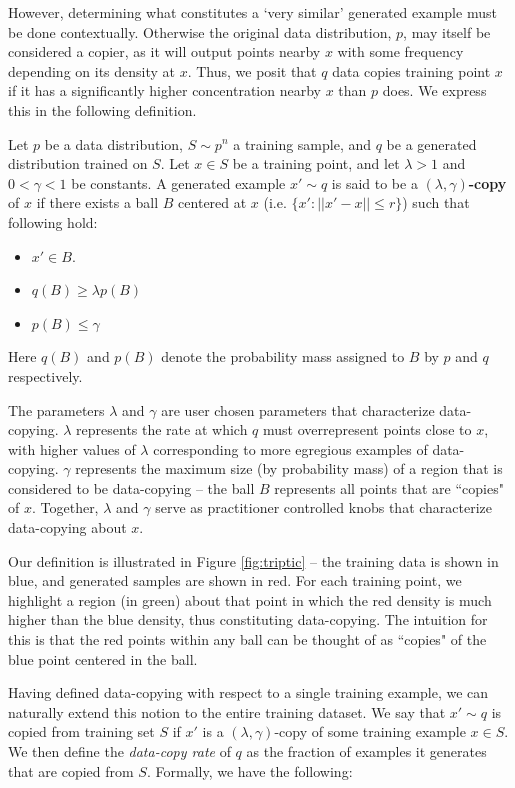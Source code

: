 However, determining what constitutes a `very similar'  generated example must be done contextually. Otherwise the original data distribution, $p$, may itself be considered a copier, as it will output points nearby $x$ with some frequency depending on its density at $x$. Thus, we posit that $q$ data copies training point $x$ if it has a significantly higher concentration nearby $x$ than $p$ does. We express this in the following definition. 

\begin{definition}\label{defn:data_copy}
Let $p$ be a data distribution, $S \sim p^n$ a training sample, and $q$ be a generated distribution trained on $S$. Let $x \in S$ be a training  point, and let $\lambda > 1$ and $0 < \gamma < 1$ be constants. A generated example $x' \sim q$ is said to be a \textbf{$(\lambda, \gamma)$-copy} of $x$ if there exists a ball $B$ centered at $x$ (i.e. $\{x': ||x' - x|| \leq r\}$) such that following hold:
\begin{itemize}
	\item $x' \in B$.
	\item $q(B) \geq \lambda p(B)$
	\item $p(B) \leq \gamma$
\end{itemize}
\end{definition}

Here $q(B)$ and $p(B)$ denote the probability mass assigned to $B$ by $p$ and $q$ respectively.

The parameters $\lambda$ and $\gamma$ are user chosen parameters that characterize data-copying. $\lambda$ represents the rate at which $q$ must overrepresent points close to $x$, with higher values of $\lambda$ corresponding to more egregious examples of data-copying. $\gamma$ represents the maximum size (by probability mass) of a region that is considered to be data-copying -- the ball $B$ represents all points that are ``copies" of $x$. Together, $\lambda$ and $\gamma$ serve as practitioner controlled knobs that characterize data-copying about $x$.

Our definition is illustrated in Figure \ref{fig:triptic} -- the training data is shown in blue, and generated samples are shown in red. For each training point, we highlight a region (in green) about that point in which the red density is much higher than the blue density, thus constituting data-copying. The intuition for this is that the red points within any ball can be thought of as ``copies" of the blue point centered in the ball.

Having defined data-copying with respect to a single training example, we can naturally extend this notion to the entire training dataset. We say that $x' \sim q$ is copied from training set $S$ if $x'$ is a $(\lambda,\gamma)$-copy of some training example $x \in S$. We then define the \textit{data-copy rate} of $q$ as the fraction of examples it generates that are copied from $S$. Formally, we have the following: 


